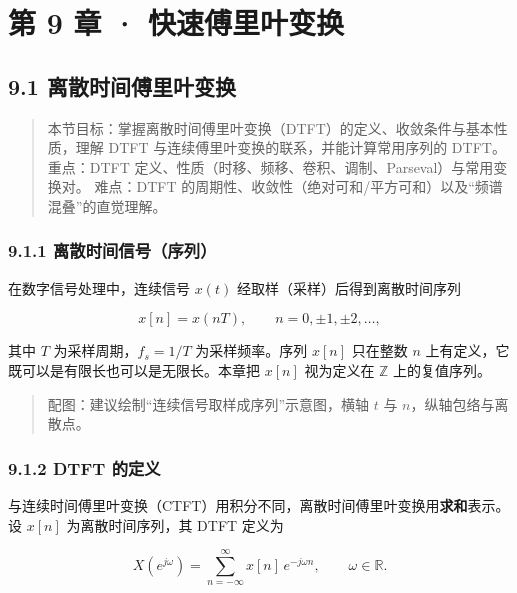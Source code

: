 \chapter{第 9 章 ·
快速傅里叶变换}\label{ux7b2c-9-ux7ae0-ux5febux901fux5085ux91ccux53f6ux53d8ux6362}

\section{9.1
离散时间傅里叶变换}\label{ux79bbux6563ux65f6ux95f4ux5085ux91ccux53f6ux53d8ux6362}

\begin{quote}
本节目标：掌握离散时间傅里叶变换（DTFT）的定义、收敛条件与基本性质，理解
DTFT 与连续傅里叶变换的联系，并能计算常用序列的 DTFT。 重点：DTFT
定义、性质（时移、频移、卷积、调制、Parseval）与常用变换对。 难点：DTFT
的周期性、收敛性（绝对可和/平方可和）以及``频谱混叠''的直觉理解。
\end{quote}

\subsection{9.1.1
离散时间信号（序列）}\label{ux79bbux6563ux65f6ux95f4ux4fe1ux53f7ux5e8fux5217}

在数字信号处理中，连续信号 \(x(t)\) 经取样（采样）后得到离散时间序列

\[
x[n] = x(nT),\qquad n = 0,\pm1,\pm2,\ldots,
\]

其中 \(T\) 为采样周期，\(f_s = 1/T\) 为采样频率。序列 \(x[n]\) 只在整数
\(n\) 上有定义，它既可以是有限长也可以是无限长。本章把 \(x[n]\)
视为定义在 \(\mathbb{Z}\) 上的复值序列。

\begin{quote}
配图：建议绘制``连续信号取样成序列''示意图，横轴 \(t\) 与
\(n\)，纵轴包络与离散点。
\end{quote}

\subsection{9.1.2 DTFT 的定义}\label{dtft-ux7684ux5b9aux4e49}

与连续时间傅里叶变换（CTFT）用积分不同，离散时间傅里叶变换用\textbf{求和}表示。设
\(x[n]\) 为离散时间序列，其 DTFT 定义为

\[
\boxed{\;X(e^{j\omega}) = \sum_{n=-\infty}^{\infty} x[n]\,e^{-j\omega n},\qquad \omega \in \mathbb{R}.\;}
\]

